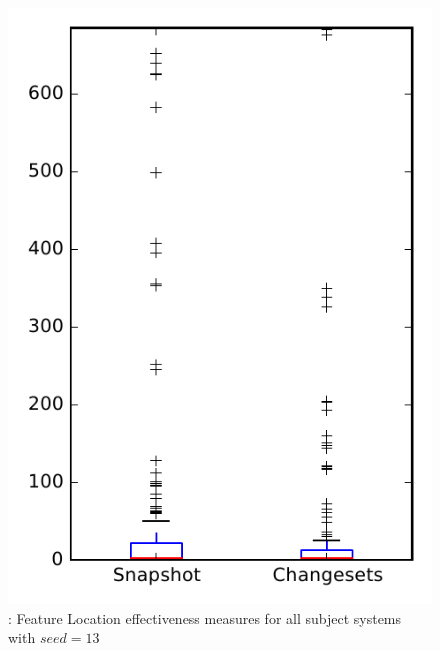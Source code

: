 
\begin{figure}
\centering
\includegraphics[height=0.4\textheight]{figures/flt_seed/rq1_overview_13}
\caption{\rone: Feature Location effectiveness measures for all subject systems with $seed=13$}
\label{fig:flt_seed:rq1:overview}
\end{figure}

